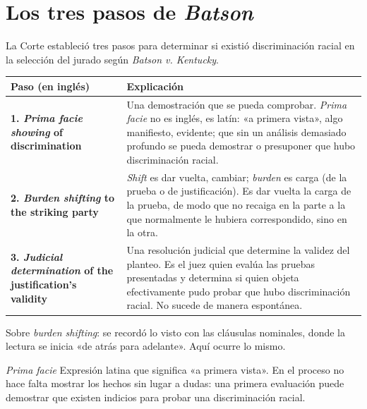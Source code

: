\documentclass[12pt,oneside]{book}
\begin{document}
\section{Los tres pasos de \textit{Batson}}

La Corte estableció tres pasos para determinar si existió discriminación racial en la selección del jurado según \textit{Batson v. Kentucky}.

\begin{table}[H]
\centering
\renewcommand{\arraystretch}{1.3}
\begin{tabularx}{\textwidth}{
    >{\raggedright\arraybackslash}p{}
    >{\raggedright\arraybackslash}X
}
\toprule
\textbf{Paso (en inglés)} & \textbf{Explicación} \\
\midrule
\textbf{1. \textit{Prima facie showing} of discrimination} & Una demostración que se pueda comprobar. \textit{Prima facie} no es inglés, es latín: «a primera vista», algo manifiesto, evidente; que sin un análisis demasiado profundo se pueda demostrar o presuponer que hubo discriminación racial. \\
\addlinespace
\textbf{2. \textit{Burden shifting} to the striking party} & \textit{Shift} es dar vuelta, cambiar; \textit{burden} es carga (de la prueba o de justificación). Es dar vuelta la carga de la prueba, de modo que no recaiga en la parte a la que normalmente le hubiera correspondido, sino en la otra. \\
\addlinespace
\textbf{3. \textit{Judicial determination} of the justification's validity} & Una resolución judicial que determine la validez del planteo. Es el juez quien evalúa las pruebas presentadas y determina si quien objeta efectivamente pudo probar que hubo discriminación racial. No sucede de manera espontánea. \\
\bottomrule
\end{tabularx}
\end{table}

\begin{note}
Sobre \textit{burden shifting}: se recordó lo visto con las cláusulas nominales, donde la lectura se inicia «de atrás para adelante». Aquí ocurre lo mismo.
\end{note}

\begin{definition}{\textit{Prima facie}}
Expresión latina que significa «a primera vista». En el proceso no hace falta mostrar los hechos sin lugar a dudas: una primera evaluación puede demostrar que existen indicios para probar una discriminación racial.
\end{definition}
\end{document}
